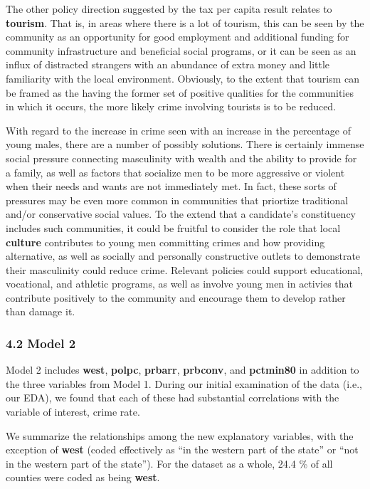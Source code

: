 \documentclass[]{article}
\begin{document}
The other policy direction suggested by the tax per capita result
relates to \textbf{tourism}. That is, in areas where there is a lot of
tourism, this can be seen by the community as an opportunity for good
employment and additional funding for community infrastructure and
beneficial social programs, or it can be seen as an influx of distracted
strangers with an abundance of extra money and little familiarity with
the local environment. Obviously, to the extent that tourism can be
framed as the having the former set of positive qualities for the
communities in which it occurs, the more likely crime involving tourists
is to be reduced.

With regard to the increase in crime seen with an increase in the
percentage of young males, there are a number of possibly solutions.
There is certainly immense social pressure connecting masculinity with
wealth and the ability to provide for a family, as well as factors that
socialize men to be more aggressive or violent when their needs and
wants are not immediately met. In fact, these sorts of pressures may be
even more common in communities that priortize traditional and/or
conservative social values. To the extend that a candidate's
constituency includes such communities, it could be fruitful to consider
the role that local \textbf{culture} contributes to young men committing
crimes and how providing alternative, as well as socially and personally
constructive outlets to demonstrate their masculinity could reduce
crime. Relevant policies could support educational, vocational, and
athletic programs, as well as involve young men in activies that
contribute positively to the community and encourage them to develop
rather than damage it.

\subsubsection{4.2 Model 2}\label{model-2}

Model 2 includes \textbf{west}, \textbf{polpc}, \textbf{prbarr},
\textbf{prbconv}, and \textbf{pctmin80} in addition to the three
variables from Model 1. During our initial examination of the data
(i.e., our EDA), we found that each of these had substantial
correlations with the variable of interest, crime rate.

We summarize the relationships among the new explanatory variables, with
the exception of \textbf{west} (coded effectively as ``in the western
part of the state'' or ``not in the western part of the state''). For
the dataset as a whole, 24.4 \% of all counties were coded as being
\textbf{west}.
\end{document}
